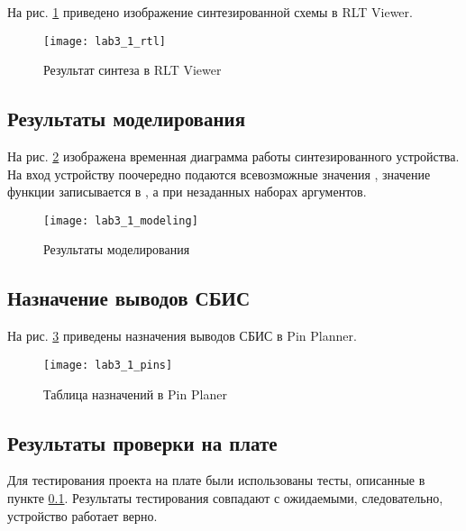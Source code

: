 На рис. \ref{fig:lab3_1_rtl} приведено изображение синтезированной схемы в RLT Viewer.

\begin{figure}[H]
\begin{center}
	\texttt{[image: lab3\_1\_rtl]}
	\caption{Результат синтеза в RLT Viewer}
	\label{fig:lab3_1_rtl}
\end{center}
\end{figure}

\subsection{Результаты моделирования}
\label{sec:lab3_1_modeling}

На рис. \ref{fig:lab3_1_modeling} изображена временная диаграмма работы синтезированного устройства. На вход устройству поочередно подаются всевозможные значения , значение функции записывается в , а  при незаданных наборах аргументов.

\begin{figure}[H]
\begin{center}
	\texttt{[image: lab3\_1\_modeling]}
	\caption{Результаты моделирования}
	\label{fig:lab3_1_modeling}
\end{center}
\end{figure}

\subsection{Назначение выводов СБИС}

На рис. \ref{fig:lab3_1_pins} приведены назначения выводов СБИС в Pin Planner.

\begin{figure}[H]
\begin{center}
	\texttt{[image: lab3\_1\_pins]}
	\caption{Таблица назначений в Pin Planer}
	\label{fig:lab3_1_pins}
\end{center}
\end{figure}

\subsection{Результаты проверки на плате}

Для тестирования проекта на плате были использованы тесты, описанные в пункте \ref{sec:lab3_1_modeling}. Результаты тестирования совпадают с ожидаемыми, следовательно, устройство работает верно.


